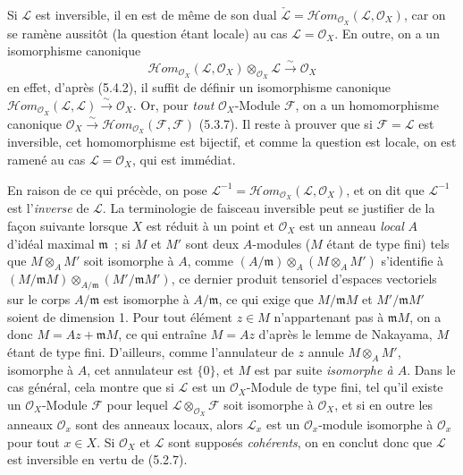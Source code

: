 \begin{env}[5.4.3]
Si $\mathcal{L}$ est inversible, il en est de même de son dual
$\check{\mathcal{L}}=
\mathcal{H}\!om_{\mathcal{O}_X}(\mathcal{L},\mathcal{O}_X)$, car on se ramène
aussitôt (la question étant locale) au cas $\mathcal{L}=\mathcal{O}_X$. En
outre, on a un isomorphisme canonique
\[
  \mathcal{H}\!om_{\mathcal{O}_X}(\mathcal{L},\mathcal{O}_X)
  \otimes_{\mathcal{O}_X}\mathcal{L}
  \xrightarrow{\sim}
  \mathcal{O}_X
  \tag{5.4.3.1}\label{0.5.4.3.1-fr}
\]
en effet, d'après (5.4.2), il suffit de définir un isomorphisme canonique
$\mathcal{H}\!om_{\mathcal{O}_X}(\mathcal{L},\mathcal{L})
\xrightarrow{\sim}\mathcal{O}_X$. Or, pour \emph{tout}
$\mathcal{O}_X$-Module $\mathcal{F}$, on a un homomorphisme canonique
$\mathcal{O}_X\xrightarrow{\sim}
\mathcal{H}\!om_{\mathcal{O}_X}(\mathcal{F},\mathcal{F})$ (5.3.7). Il reste
à prouver que si $\mathcal{F}=\mathcal{L}$ est inversible, cet homomorphisme
est bijectif, et comme la question est locale, on est ramené au cas
$\mathcal{L}=\mathcal{O}_X$, qui est immédiat.

En raison de ce qui précède, on pose
$\mathcal{L}^{-1}=
\mathcal{H}\!om_{\mathcal{O}_X}(\mathcal{L},\mathcal{O}_X)$, et on dit que
$\mathcal{L}^{-1}$ est l'\emph{inverse} de $\mathcal{L}$. La terminologie de
\og faisceau inversible\fg{} peut se justifier de la façon suivante lorsque $X$ est
réduit à un point et $\mathcal{O}_X$ est un anneau \emph{local} $A$ d'idéal
maximal $\mathfrak m$~; si $M$ et $M'$ sont deux $A$-modules ($M$ étant de
type fini) tels que $M\otimes_A M'$ soit isomorphe à $A$, comme
$(A/\mathfrak m)\otimes_A(M\otimes_A M')$ s'identifie à
$(M/\mathfrak mM)\otimes_{A/\mathfrak m}(M'/\mathfrak mM')$, ce dernier
produit tensoriel d'espaces vectoriels sur le corps $A/\mathfrak m$ est
isomorphe à $A/\mathfrak m$, ce qui exige que $M/\mathfrak mM$ et
$M'/\mathfrak mM'$ soient de dimension 1. Pour tout élément $z\in M$
n'appartenant pas à $\mathfrak mM$, on a donc $M=Az+\mathfrak mM$, ce qui
entraîne $M=Az$ d'après le lemme de Nakayama, $M$ étant de type fini.
D'ailleurs, comme l'annulateur de $z$ annule $M\otimes_A M'$, isomorphe à
$A$, cet annulateur est $\{0\}$, et $M$ est par suite \emph{isomorphe à $A$}.
Dans le cas général, cela montre que si $\mathcal{L}$ est un
$\mathcal{O}_X$-Module de type fini, tel qu'il existe un
$\mathcal{O}_X$-Module $\mathcal{F}$ pour lequel
$\mathcal{L}\otimes_{\mathcal{O}_X}\mathcal{F}$ soit isomorphe à
$\mathcal{O}_X$, et si en outre les anneaux $\mathcal{O}_x$ sont des anneaux
locaux, alors $\mathcal{L}_x$ est un $\mathcal{O}_x$-module isomorphe à
$\mathcal{O}_x$ pour tout $x\in X$. Si $\mathcal{O}_X$ et $\mathcal{L}$ sont
supposés \emph{cohérents}, on en conclut donc que $\mathcal{L}$ est inversible
en vertu de (5.2.7).
\end{env}

